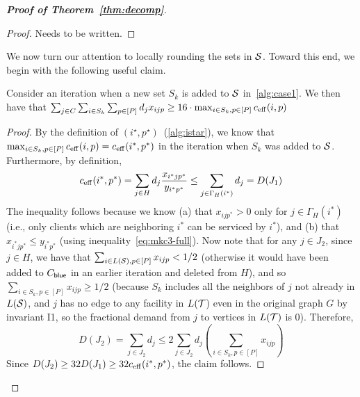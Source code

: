 \begin{proof}[{\bf Proof of Theorem~\ref{thm:decomp}}]
\begin{proof}
Needs to be written. 

%
\end{proof}

\medskip \noindent We now turn our attention to locally rounding the sets in ${\cal S}$. Toward this end, we begin with the following useful claim.

\begin{claim}\label{clm:imp}
Consider an iteration when a new set $S_k$ is added to ${\cal S}$ in~\cref{alg:case1}. We then have that $\sum_{j\in C} \sum_{i\in S_k}  \sum_{p\in [P]} d_j x_{ijp} \geq 16\cdot \max_{i\in S_k, p\in [P]} c_{\mathrm{eff}}(i,p) $
\end{claim}
\begin{proof}
By the definition of $(i^\star, p^\star)$~(\cref{alg:istar}), we know that $ \max_{i\in S_k, p\in [P]} c_{\mathrm{eff}}(i,p)  = c_{\mathrm{eff}}(i^*,p^*)$ in the iteration when $S_k$ was added to ${\cal S}$. Furthermore, by definition,
\[c_{\mathrm{eff}}(i^*,p^*) = \sum_{j\in H} d_j \frac{x_{i^*jp^*}}{y_{i^*p^*}} \leq \sum_{j\in \Gamma_H(i^*)} d_j = D(J_1)\]
The inequality follows because we know  (a) that $x_{ijp^*} > 0$ only for $j\in \Gamma_H(i^*)$ (i.e., only clients which are neighboring $i^*$ can be serviced by $i^*$), and (b) that $x_{i^*jp^*} \leq y_{i^*p^*}$ (using inequality~\eqref{eq:mkc3-full}).
Now note that for any $j\in J_2$, since $j\in H$, we have that $\sum_{i\in L({\cal S}), p\in [P]} x_{ijp} < 1/2$ (otherwise it would have been added
to $C_{\mathsf{blue}}$ in an earlier iteration and deleted from $H$), and so $\sum_{i\in S_k, p\in [P]} x_{ijp} \geq 1/2$ (because $S_k$ includes all the neighbors of $j$ not already in $L({\cal S})$, and $j$ has no edge to any facility in $L({\cal T}$) even in the original graph $G$ by invariant I1, so the fractional demand from $j$ to vertices in $L({\cal T})$ is $0$).
Therefore,
\[
D(J_2) = \sum_{j\in J_2} d_j \leq 2 \sum_{j\in J_2} d_j \left(\sum_{i\in S_k, p\in [P]} x_{ijp}\right)
\]
Since $D(J_2) \geq 32D(J_1) \geq 32c_{\mathrm{eff}}(i^*,p^*)$, the claim follows.
\end{proof}



\end{proof}
